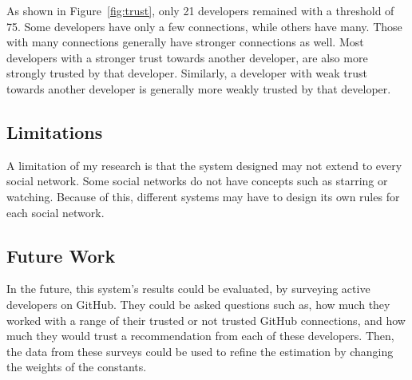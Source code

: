 \documentclass{acm_proc_article-sp}
\begin{document}
  As shown in Figure~\ref{fig:trust}, only 21 developers remained with a threshold of 75. Some developers have only a few connections, while others have many. Those with many connections generally have stronger connections as well. Most developers with a stronger trust towards another developer, are also more strongly trusted by that developer. Similarly, a developer with weak trust towards another developer is generally more weakly trusted by that developer.

  \subsection{Limitations}
    A limitation of my research is that the system designed may not extend to every social network. Some social networks do not have concepts such as starring or watching. Because of this, different systems may have to design its own rules for each social network.

  \subsection{Future Work}
    In the future, this system's results could be evaluated, by surveying active developers on GitHub. They could be asked questions such as, how much they worked with a range of their trusted or not trusted GitHub connections, and how much they would trust a recommendation from each of these developers. Then, the data from these surveys could be used to refine the estimation by changing the weights of the constants.




\balancecolumns
\end{document}
